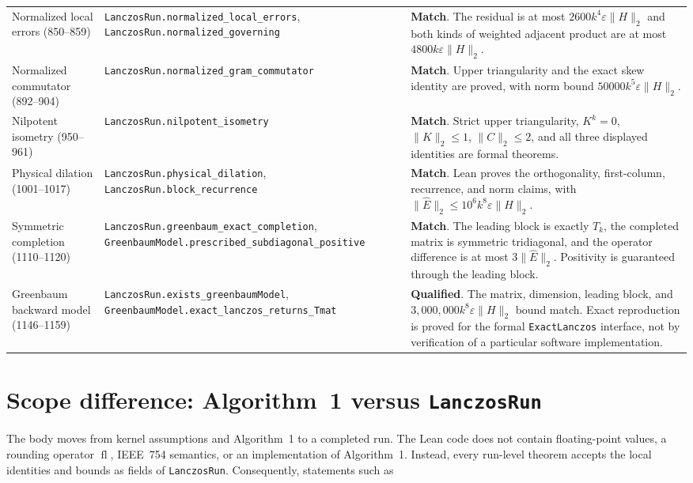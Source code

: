 \documentclass[11pt]{article}
\newcommand{\norm}[1]{\lVert #1\rVert_2}
\newcommand{\eps}{\varepsilon}
\newcommand{\lean}[1]{\nolinkurl{#1}}
\newcommand{\match}{\textcolor{ok}{\textbf{Match}}}
\newcommand{\qualified}{\textcolor{warn}{\textbf{Qualified}}}
\begin{document}
\begin{longtable}{@{}>{\raggedright\arraybackslash}p{}
                    >{\raggedright\arraybackslash}p{}
                    >{\raggedright\arraybackslash}p{}@{}}
Normalized local errors (850--859)
& \lean{LanczosRun.normalized\_local\_errors},
\lean{LanczosRun.normalized\_governing}
& \match.  The residual is at most $2600k^4\eps\norm H$ and both kinds of
weighted adjacent product are at most $4800k\eps\norm H$. \\

Normalized commutator (892--904)
& \lean{LanczosRun.normalized\_gram\_commutator}
& \match.  Upper triangularity and the exact skew identity are proved, with
norm bound $50000k^5\eps\norm H$. \\

Nilpotent isometry (950--961)
& \lean{LanczosRun.nilpotent\_isometry}
& \match.  Strict upper triangularity, $K^k=0$, $\norm K\le1$,
$\norm C\le2$, and all three displayed identities are formal theorems. \\

Physical dilation (1001--1017)
& \lean{LanczosRun.physical\_dilation},
\lean{LanczosRun.block\_recurrence}
& \match.  Lean proves the orthogonality, first-column, recurrence, and norm
claims, with $\norm{\widehat E}\le10^6k^8\eps\norm H$. \\

Symmetric completion (1110--1120)
& \lean{LanczosRun.greenbaum\_exact\_completion},
\lean{GreenbaumModel.prescribed\_subdiagonal\_positive}
& \match.  The leading block is exactly $T_k$, the completed matrix is
symmetric tridiagonal, and the operator difference is at most
$3\norm{\widehat E}$.  Positivity is guaranteed through the leading block. \\

Greenbaum backward model (1146--1159)
& \lean{LanczosRun.exists\_greenbaumModel},
\lean{GreenbaumModel.exact\_lanczos\_returns\_Tmat}
& \qualified.  The matrix, dimension, leading block, and
$3{,}000{,}000k^8\eps\norm H$ bound match.  Exact reproduction is proved for
the formal \lean{ExactLanczos} interface, not by verification of a particular
software implementation. \\

\end{longtable}

\section*{Scope difference: Algorithm~1 versus \texttt{LanczosRun}}

The body moves from kernel assumptions and Algorithm~1 to a completed run.
The Lean code does not contain floating-point values, a rounding operator
$\operatorname{fl}$, IEEE~754 semantics, or an implementation of Algorithm~1.
Instead, every run-level theorem accepts the local identities and bounds as
fields of \lean{LanczosRun}.  Consequently, statements such as
\end{document}
